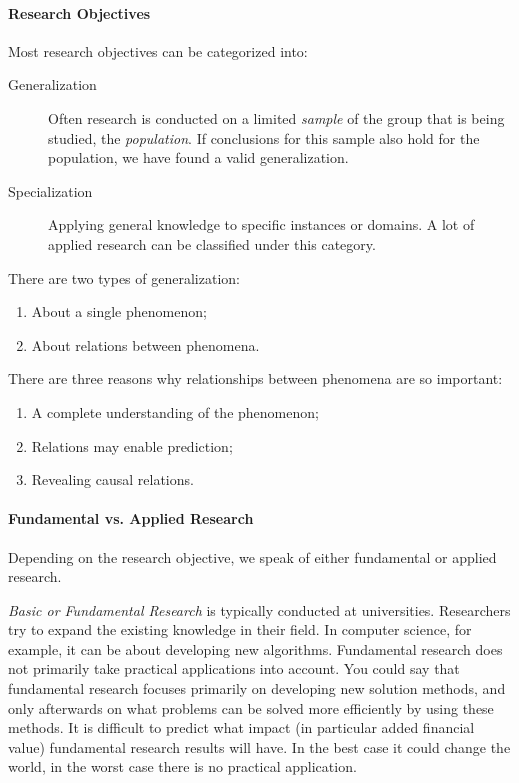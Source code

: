 \paragraph{Research Objectives}

Most research objectives can be categorized into:

\begin{description}
  \item[Generalization] Often research is conducted on a limited \emph{sample} of the group that is being studied, the \emph{population}. If conclusions for this sample also hold for the population, we have found a valid generalization.
  \item[Specialization] Applying general knowledge to specific instances or domains. A lot of applied research can be classified under this category.
\end{description}

There are two types of generalization:

\begin{enumerate}
	\item About a single phenomenon;
	\item About relations between phenomena.
\end{enumerate}

There are three reasons why relationships between phenomena are so important:

\begin{enumerate}
	\item A complete understanding of the phenomenon;
	\item Relations may enable prediction;
	\item Revealing causal relations.
\end{enumerate}

\paragraph {Fundamental vs. Applied Research}
Depending on the research objective, we speak of either fundamental or applied research.

\emph{Basic or Fundamental Research} is typically conducted at universities. Researchers try to expand the existing knowledge in their field. In computer science, for example, it can be about developing new algorithms. Fundamental research does not primarily take practical applications into account. You could say that fundamental research focuses primarily on developing new solution methods, and only afterwards on what problems can be solved more efficiently by using these methods. It is difficult to predict what impact (in particular added financial value) fundamental research results will have. In the best case it could change the world, in the worst case there is no practical application.


